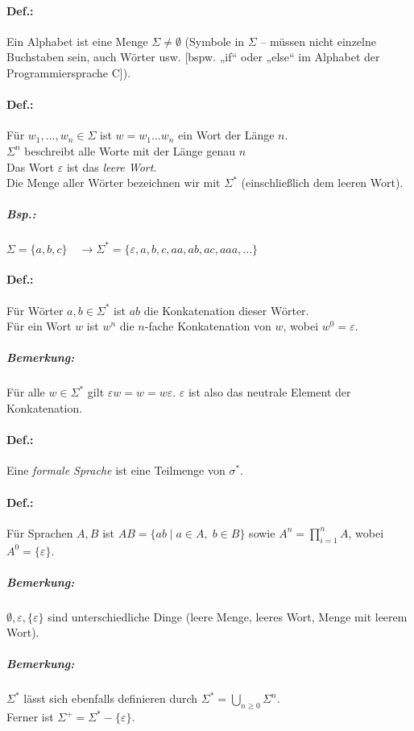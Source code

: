 \paragraph{Def.:} Ein Alphabet ist eine Menge $\Sigma \not = \emptyset$ (Symbole in $\Sigma$ -- müssen nicht einzelne Buchstaben sein, auch Wörter usw. [bspw. „if“ oder „else“ im Alphabet der Programmiersprache C]).

\paragraph{Def.:} Für $w_1, ..., w_n \in \Sigma$ ist $w=w_1...w_n$ ein Wort der Länge $n$.\\
$\Sigma^n$ beschreibt alle Worte mit der Länge genau $n$\\
Das Wort $\varepsilon$ ist das \emph{leere Wort}.\\
Die Menge aller Wörter bezeichnen wir mit $\Sigma^*$ (einschließlich dem leeren Wort).

\subparagraph{Bsp.:} $\Sigma = \{a,b,c\}\quad \rightarrow \Sigma^*=\{\varepsilon, a, b, c, aa, ab,a c, aaa, ...\}$
\paragraph{Def.:} Für Wörter $a,b \in \Sigma^*$ ist $ab$ die Konkatenation dieser Wörter.\\
Für ein Wort $w$ ist $w^n$ die $n$-fache Konkatenation von $w$, wobei $w^0=\varepsilon$.

\subparagraph{Bemerkung:} Für alle $w \in \Sigma^*$ gilt $\varepsilon w = w = w \varepsilon$. $\varepsilon$ ist also das neutrale Element der Konkatenation.

\paragraph{Def.:} Eine \emph{formale Sprache} ist eine Teilmenge von $\sigma^*$.

\paragraph{Def.:} Für Sprachen $A, B$ ist $AB=\{ab \;|\; a \in A, \; b \in B\}$ sowie $A^n=\prod_{i=1}^{n}A$, wobei $A^0=\{\varepsilon\}$.
\subparagraph{Bemerkung:} $\emptyset, \varepsilon, \{\varepsilon\}$ sind unterschiedliche Dinge (leere Menge, leeres Wort, Menge mit leerem Wort).

\subparagraph{Bemerkung:} $\Sigma^*$ lässt sich ebenfalls definieren durch $\Sigma^*=\bigcup_{n\geq 0}\Sigma^n$.\\
Ferner ist $\Sigma^+=\Sigma^*-\{\varepsilon\}$.

